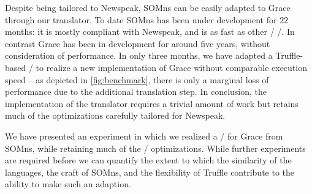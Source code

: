 Despite being tailored to Newspeak, SOMns can be easily adapted to Grace through our translator. To date SOMns has been under development for $22$ months: it is mostly compliant with Newspeak, and is as fast as other \JITing/ \VMs/. In contrast Grace has been in development for around five years, without consideration of performance. In only three months, we have adapted a Truffle-based \VM/ to realize a new implementation of Grace without comparable execution speed -- as depicted in \autoref{fig:benchmark}, there is only a marginal loss of performance due to the additional translation step. In conclusion, the implementation of the translator requires a trivial amount of work but retains much of the optimizations carefully tailored for Newspeak.

We have presented an experiment in which we realized a \VM/ for Grace from SOMns, while retaining much of the \AST/ optimizations. While further experiments are required before we can quantify the extent to which the similarity of the languages, the craft of SOMns, and the flexibility of Truffle contribute to the ability to make such an adaption. 

